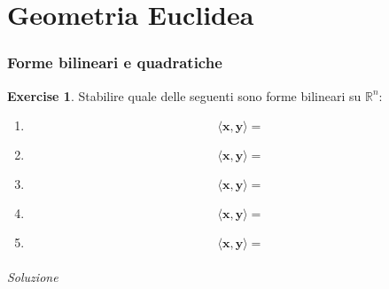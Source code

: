 \documentclass{article}
\theoremstyle{plain}
\theoremstyle{definition}
\newtheorem{xca}[exmp]{Exercise}
\theoremstyle{remark}
\begin{document}
\newpage
\part{Geometria Euclidea}
\newpage

\newpage
\section{Forme bilineari e quadratiche}
\vspace{20pt}

\begin{bxthm}
\begin{xca}
    Stabilire quale delle seguenti sono forme bilineari su $\mathbb{R}^n$:
    \begin{enumerate}
        \item \[\langle\mathbf{x},\mathbf{y}\rangle = \]
        \item \[\langle\mathbf{x},\mathbf{y}\rangle = \]
        \item \[\langle\mathbf{x},\mathbf{y}\rangle = \]
        \item \[\langle\mathbf{x},\mathbf{y}\rangle = \]
        \item \[\langle\mathbf{x},\mathbf{y}\rangle = \]
    \end{enumerate}
\end{xca}
\end{bxthm}
\paragraph{Soluzione}

\vspace{10pt}
\end{document}
